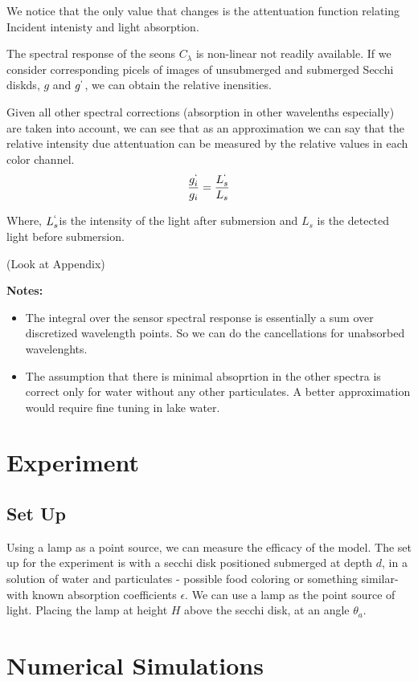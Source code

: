 \documentclass{article}
\begin{document}
We notice that the only value that changes is the attentuation function relating Incident intenisty
and light absorption.

The spectral response of the seons $ C_\lambda$ is non-linear not readily available.
If we consider corresponding picels of images of unsubmerged and submerged Secchi
diskds, $ g$ and $g^`$, we can obtain the relative inensities.

Given all other spectral corrections (absorption in other wavelenths especially) are taken into account,
we can see that as an approximation we can say that the relative intensity due attentuation can be
measured by the relative values in each color channel.
\begin{align}
\frac{g_i^`}{g_i} = \frac{L^`_{s}}{L_{s}}
\end{align}

Where, $ L^`_{s}$is the intensity of the light after submersion and $ L_{s}$ is the detected light before submersion.

(Look at Appendix)

\textbf{Notes: }
\begin{itemize}
  \item The integral over the sensor spectral response is essentially a sum over discretized wavelength
  points. So we can do the cancellations for unabsorbed wavelenghts.
  \item The assumption that there is minimal absoprtion in the other spectra is correct only for water without
  any other particulates. A better approximation would require fine tuning in lake water.
\end{itemize}
\section{Experiment}

\subsection{Set Up}
Using a lamp as a point source, we can measure the efficacy of the model. The set up for the experiment is
with a secchi disk positioned submerged at depth $d$, in a solution of water and particulates - possible food coloring
or something similar- with known absorption coefficients $ \epsilon$. We can use a lamp as the point source of light. Placing
the lamp at height $ H$ above the secchi disk, at an angle $\theta_a$.

\section{Numerical Simulations}
\end{document}
